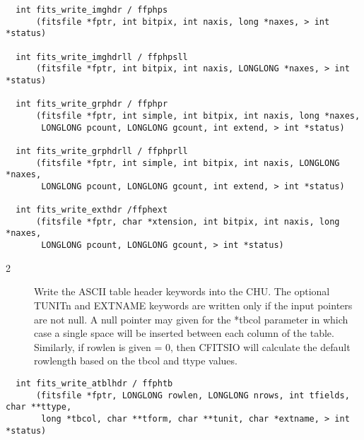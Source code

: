 \documentclass[11pt]{book}
\begin{document}
\begin{verbatim}
  int fits_write_imghdr / ffphps
      (fitsfile *fptr, int bitpix, int naxis, long *naxes, > int *status)

  int fits_write_imghdrll / ffphpsll
      (fitsfile *fptr, int bitpix, int naxis, LONGLONG *naxes, > int *status)

  int fits_write_grphdr / ffphpr
      (fitsfile *fptr, int simple, int bitpix, int naxis, long *naxes,
       LONGLONG pcount, LONGLONG gcount, int extend, > int *status)

  int fits_write_grphdrll / ffphprll
      (fitsfile *fptr, int simple, int bitpix, int naxis, LONGLONG *naxes,
       LONGLONG pcount, LONGLONG gcount, int extend, > int *status)

  int fits_write_exthdr /ffphext
      (fitsfile *fptr, char *xtension, int bitpix, int naxis, long *naxes,
       LONGLONG pcount, LONGLONG gcount, > int *status)

\end{verbatim}

\begin{description}
\item[2 ] Write the ASCII table header keywords into the CHU.  The optional
    TUNITn and EXTNAME keywords are written only if the input pointers
    are not null.  A null pointer may given for the
    *tbcol parameter in which case a single space will be inserted
    between each column of the table.  Similarly, if rowlen is
    given = 0, then CFITSIO will calculate the default rowlength based on
   the tbcol and ttype values. \label{ffphtb}
\end{description}

\begin{verbatim}
  int fits_write_atblhdr / ffphtb
      (fitsfile *fptr, LONGLONG rowlen, LONGLONG nrows, int tfields, char **ttype,
       long *tbcol, char **tform, char **tunit, char *extname, > int *status)
\end{verbatim}
\end{document}

